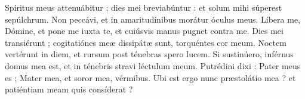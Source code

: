 
Spíritus meus attenuábitur ; dies mei breviabúntur : et solum mihi súperest sepúlchrum.
Non peccávi, et in amaritudínibus morátur óculus meus.
Líbera me, Dómine, et pone me iuxta te, et cuiúsvis manus pugnet contra me.
Dies mei transiérunt ; cogitatiónes meæ dissipátæ sunt, torquéntes cor meum.
Noctem vertérunt in diem, et rursum post ténebras spero lucem.
Si sustinúero, inférnus domus mea est, et in ténebris stravi léctulum meum.
Putrédini dixi : Pater meus es ; Mater mea, et soror mea, vérmibus.
Ubi est ergo nunc præstolátio mea ? et patiéntiam meam quis consíderat ?